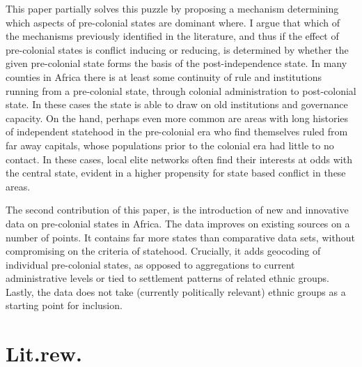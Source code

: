 \documentclass[12pt]{article}
\begin{document}
This paper partially solves this puzzle by proposing a mechanism determining
which aspects of pre-colonial states are dominant where. I argue that which of
the mechanisms previously identified in the literature, and thus if the effect
of pre-colonial states is conflict inducing or reducing, is determined by
whether the given pre-colonial state forms the basis of the post-independence
state. In many counties in Africa there is at least some continuity of rule and
institutions running from a pre-colonial state, through colonial administration
to post-colonial state. In these cases the state is able to draw on old
institutions and governance capacity. On the hand, perhaps even more common are
areas with long histories of independent statehood in the pre-colonial era who
find themselves ruled from far away capitals, whose populations prior to the
colonial era had little to no contact. In these cases, local elite networks
often find their interests at odds with the central state, evident in a higher
propensity for state based conflict in these areas.

The second contribution of this paper, is the introduction of new and innovative
data on pre-colonial states in Africa. The data improves on existing sources on
a number of points. It contains far more states than comparative data sets,
without compromising on the criteria of statehood. Crucially, it adds geocoding
of individual pre-colonial states, as opposed to aggregations to current
administrative levels or tied to settlement patterns of related ethnic groups.
Lastly, the data does not take (currently politically relevant) ethnic groups as
a starting point for inclusion. %

\section{Lit.rew.}
\end{document}
